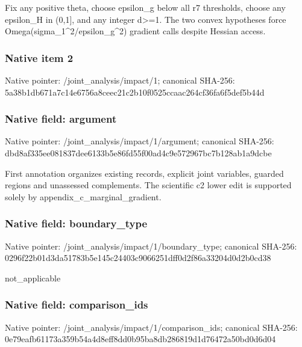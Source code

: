 \documentclass[10pt,a4paper]{article}
\begin{document}
\begingroup\raggedright\sloppy Fix any positive theta,\allowbreak{} choose epsilon\_\allowbreak{}g below all r7 thresholds,\allowbreak{} choose any epsilon\_\allowbreak{}H in (0,\allowbreak{}1],\allowbreak{} and any integer d>=\allowbreak{}1. The two convex hypotheses force Omega(sigma\_\allowbreak{}1\textasciicircum{}2/\allowbreak{}epsilon\_\allowbreak{}g\textasciicircum{}2) gradient calls despite Hessian access.\par\endgroup

\subsubsection{Native item 2}
Native pointer: /joint\_\allowbreak{}analysis/impact/1; canonical SHA-256: 5a38b1db671a7c14e6756a8ceec21c2b10f0525ccaac264cf36fa6f5def5b44d

\subsubsection{Native field: argument}
Native pointer: /joint\_\allowbreak{}analysis/impact/1/argument; canonical SHA-256: dbd8af335ee081837dee6133b5e86fd55f00ad4c9e572967bc7b128ab1a9dcbe

\begingroup\raggedright\sloppy First annotation organizes existing records,\allowbreak{} explicit joint variables,\allowbreak{} guarded regions and unassessed complements. The scientific c2 lower edit is supported solely by appendix\_\allowbreak{}c\_\allowbreak{}marginal\_\allowbreak{}gradient.\par\endgroup

\subsubsection{Native field: boundary\_\allowbreak{}type}
Native pointer: /joint\_\allowbreak{}analysis/impact/1/boundary\_\allowbreak{}type; canonical SHA-256: 0296f22b01d3da51783b5e145c24403c9066251dff0d2f86a33204d0d2b0cd38

\begingroup\raggedright\sloppy not\_\allowbreak{}applicable\par\endgroup

\subsubsection{Native field: comparison\_\allowbreak{}ids}
Native pointer: /joint\_\allowbreak{}analysis/impact/1/comparison\_\allowbreak{}ids; canonical SHA-256: 0e79eafb61173a359b54a4d8eff8dd0b95ba8db286819d1d76472a50bd0d6d04
\end{document}
